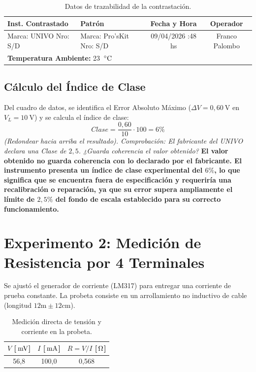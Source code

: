 \documentclass{informeutn}
\begin{document}
\vspace{0.5cm}
\begin{table}[H]
    \centering
    \begin{tabular}{|p{4cm}|p{4cm}|c|c|}
        \hline
        \textbf{Inst. Contrastado} & \textbf{Patrón} & \textbf{Fecha y Hora} & \textbf{Operador} \\ \hline
        Marca: UNIVO \newline Nro: S/D & Marca: Pro'sKit \newline Nro: S/D & 09/04/2026 \newline 17:48 hs & Franco \newline Palombo \\ \hline
        \multicolumn{4}{|l|}{\textbf{Temperatura Ambiente:} 23 $\Celsius$} \\ \hline
    \end{tabular}
    \caption{Datos de trazabilidad de la contrastación.}
\end{table}

\subsection{Cálculo del Índice de Clase}
Del cuadro de datos, se identifica el Error Absoluto Máximo ($\Delta V = 0,60 \ \text{V}$ en $V_L = 10 \ \text{V}$) y se calcula el índice de clase:
\begin{equation}
    Clase = \frac{0,60}{10} \cdot 100 = 6 \percent
\end{equation}
\textit{(Redondear hacia arriba el resultado). Comprobación: El fabricante del UNIVO declara una Clase de $2,5$. ¿Guarda coherencia el valor obtenido?} \textbf{El valor obtenido no guarda coherencia con lo declarado por el fabricante. El instrumento presenta un índice de clase experimental del $6\%$, lo que significa que se encuentra fuera de especificación y requeriría una recalibración o reparación, ya que su error supera ampliamente el límite de $2,5\%$ del fondo de escala establecido para su correcto funcionamiento.}

\section{Experimento 2: Medición de Resistencia por 4 Terminales}
Se ajustó el generador de corriente (LM317) para entregar una corriente de prueba constante. La probeta consiste en un arrollamiento no inductivo de cable (longitud $12\text{m} \pm 12\text{cm}$).

\begin{table}[H]
    \centering
    \begin{tabular}{|c|c|c|}
        \hline
        $V$ [$\mV$] & $I$ [$\mA$] & $R = V/I$ [$\ohm$] \\ \hline
        56,8 & 100,0 & 0,568 \\ \hline
    \end{tabular}
    \caption{Medición directa de tensión y corriente en la probeta.}
\end{table}
\end{document}
